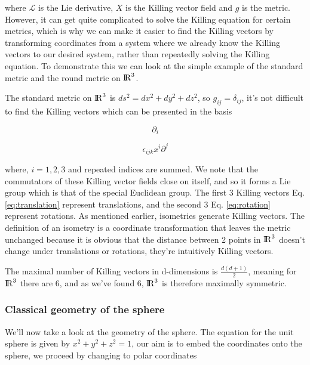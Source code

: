 \documentclass[a4paper,11pt]{article}
\numberwithin{equation}{section}
\numberwithin{figure}{section}
\begin{document}
\begin{large}
where $\mathcal{L}$ is the Lie derivative, $X$ is the Killing vector field and $g$ is the metric. However, it can get quite complicated to solve the Killing equation for certain metrics, which is why we can make it easier to find the Killing vectors by transforming coordinates from a system where we already know the Killing vectors to our desired system, rather than repeatedly solving the Killing equation. To demonstrate this we can look at the simple example of the standard metric and the round metric on ${\rm I\!R}^3$.

The standard metric on ${\rm I\!R}^3$ is $ds^2=dx^2+dy^2+dz^2$, so $g_{ij}=\delta_{ij}$, it's not difficult to find the Killing vectors which can be presented in the basis

\begin{equation}
\label{eq:translation}
 \partial_i
\end{equation}

\begin{equation}
\label{eq:rotation}
\epsilon_{ijk}x^i\partial^j
\end{equation}


where, $i=1,2,3$ and repeated indices are summed. We note that the commutators of these Killing vector fields close on itself, and so it forms a Lie group which is that of the special Euclidean group. The first 3 Killing vectors Eq. \eqref{eq:translation} represent translations, and the second 3 Eq. \eqref{eq:rotation} represent rotations. As mentioned earlier, isometries generate Killing vectors. The definition of an isometry is a coordinate transformation that leaves the metric unchanged because it is obvious that the distance between 2 points in ${\rm I\!R}^3$ doesn't change under translations or rotations, they're intuitively Killing vectors.

The maximal number of Killing vectors in d-dimensions is $\frac{d(d+1)}{2}$, meaning for ${\rm I\!R}^3$ there are 6, and as we've found 6, ${\rm I\!R}^3$ is therefore maximally symmetric.


\newpage


\subsubsection{Classical geometry of the sphere}


We'll now take a look at the geometry of the sphere. The equation for the unit sphere is given by $x^2+y^2+z^2=1$, our aim is to embed the coordinates onto the sphere, we proceed by changing to polar coordinates


\end{large}
\end{document}
